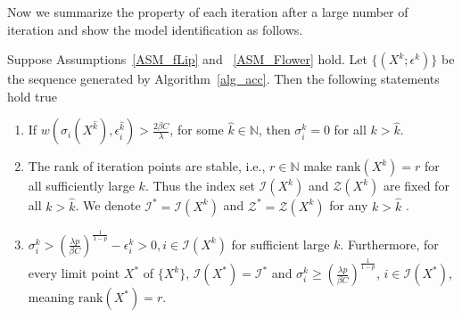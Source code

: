 \documentclass[twoside,11pt]{article}
\newcommand{\Ical}{\mathcal{I}}
\numberwithin{equation}{section}
\begin{document}
Now we summarize the property of each iteration after a large number of iteration and show the model identification as follows.
\begin{theorem} \label{THM_away_zero}
  Suppose Assumptions~\ref{ASM_fLip} and ~\ref{ASM_Flower} hold. Let $\{ (X^{k};\epsilon^{k}) \} $ be the sequence generated by Algorithm~\ref{alg_acc}. Then the following statements hold true
\begin{enumerate}[label={\roman*).},leftmargin=*]
  \item If $w(\sigma_{i} ({X^{\hat{k}}}),\epsilon_{i}^{\hat{k}}) > \frac{2\beta C}{\lambda} $, for some $\hat{k}\in\mathbb{N}$, then $\sigma_i^k = 0 $ for all $k>\hat{k} $. 
  \item The rank of iteration points are stable, {i.e.}, $r\in\mathbb{N}$ make $\mathrm{rank} (X^{k}) = r$ for all sufficiently large $k$. Thus the index set $\mathcal{I} (X^{k}) $ and $\mathcal{Z} (X^{k}) $ are fixed for all $k>\hat{k} $. We denote $\mathcal{I}^{*}=\mathcal{I} (X^{k}) $ and $\mathcal{Z}^{*}=\mathcal{Z} (X^{k}) $ for any $k>\hat{k} $ .
  \item   $\sigma_i^k> \left(\frac{\lambda p}{\beta C}\right)^{\frac{1}{1-p}}-\epsilon_{i}^{k} > 0, i\in\mathcal{I} (X^{k}) $ for sufficient large $k$.  Furthermore, for every limit point $X^{*} $ of $\{X^{k}\} $, $\Ical(X^*) = \Ical^*$ and   $\sigma_i^k\ge\left(\frac{\lambda p}{\beta C}\right)^{\frac{1}{1-p}}$, $i\in\Ical(X^*)$, meaning $\text{rank}(X^*) = r$.  
\end{enumerate}     
\end{theorem}
\end{document}
